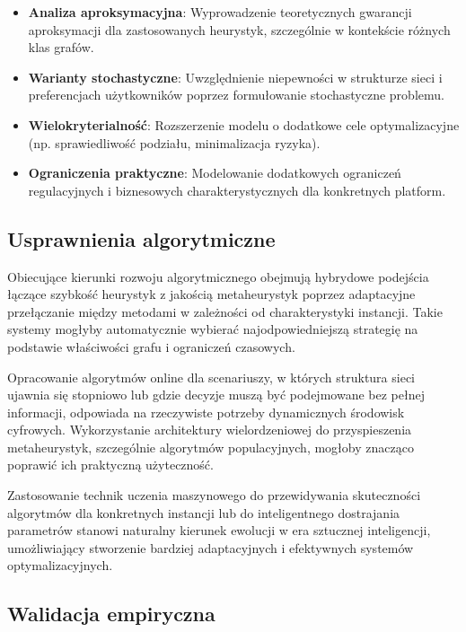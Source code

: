 \begin{itemize}
\item \textbf{Analiza aproksymacyjna}: Wyprowadzenie teoretycznych gwarancji aproksymacji dla zastosowanych heurystyk, szczególnie w kontekście różnych klas grafów.

\item \textbf{Warianty stochastyczne}: Uwzględnienie niepewności w strukturze sieci i preferencjach użytkowników poprzez formułowanie stochastyczne problemu.

\item \textbf{Wielokryterialność}: Rozszerzenie modelu o dodatkowe cele optymalizacyjne (np. sprawiedliwość podziału, minimalizacja ryzyka).

\item \textbf{Ograniczenia praktyczne}: Modelowanie dodatkowych ograniczeń regulacyjnych i biznesowych charakterystycznych dla konkretnych platform.
\end{itemize}

\subsection{Usprawnienia algorytmiczne}

Obiecujące kierunki rozwoju algorytmicznego obejmują hybrydowe podejścia łączące szybkość heurystyk z jakością metaheurystyk poprzez adaptacyjne przełączanie między metodami w zależności od charakterystyki instancji. Takie systemy mogłyby automatycznie wybierać najodpowiedniejszą strategię na podstawie właściwości grafu i ograniczeń czasowych.

Opracowanie algorytmów online dla scenariuszy, w których struktura sieci ujawnia się stopniowo lub gdzie decyzje muszą być podejmowane bez pełnej informacji, odpowiada na rzeczywiste potrzeby dynamicznych środowisk cyfrowych. Wykorzystanie architektury wielordzeniowej do przyspieszenia metaheurystyk, szczególnie algorytmów populacyjnych, mogłoby znacząco poprawić ich praktyczną użyteczność.

Zastosowanie technik uczenia maszynowego do przewidywania skuteczności algorytmów dla konkretnych instancji lub do inteligentnego dostrajania parametrów stanowi naturalny kierunek ewolucji w era sztucznej inteligencji, umożliwiający stworzenie bardziej adaptacyjnych i efektywnych systemów optymalizacyjnych.

\subsection{Walidacja empiryczna}

